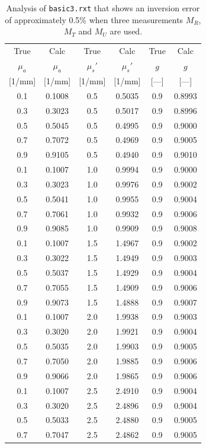 \documentclass{article}
\begin{document}
\begin{table}
\begin{center}
\begin{tabular}{cc|cc|cc}
True & Calc & True & Calc& True & Calc\\
$\mu_a$ & $\mu_a$ & $\mu_s'$ & $\mu_s'$ & $g$ &$g$\\
\hbox{}[1/mm] & [1/mm] & [1/mm] & [1/mm]& [---]& [---]  \\
\hline
0.1 & 0.1008 & 0.5 & 0.5035 & 0.9 & 0.8993\\
0.3 & 0.3023 & 0.5 & 0.5017 & 0.9 & 0.8996\\
0.5 & 0.5045 & 0.5 & 0.4995 & 0.9 & 0.9000\\
0.7 & 0.7072 & 0.5 & 0.4969 & 0.9 & 0.9005\\
0.9 & 0.9105 & 0.5 & 0.4940 & 0.9 & 0.9010\\[2mm]
0.1 & 0.1007 & 1.0 & 0.9994 & 0.9 & 0.9000\\
0.3 & 0.3023 & 1.0 & 0.9976 & 0.9 & 0.9002\\
0.5 & 0.5041 & 1.0 & 0.9955 & 0.9 & 0.9004\\
0.7 & 0.7061 & 1.0 & 0.9932 & 0.9 & 0.9006\\
0.9 & 0.9085 & 1.0 & 0.9909 & 0.9 & 0.9008\\[2mm]
0.1 & 0.1007 & 1.5 & 1.4967 & 0.9 & 0.9002\\
0.3 & 0.3022 & 1.5 & 1.4949 & 0.9 & 0.9003\\
0.5 & 0.5037 & 1.5 & 1.4929 & 0.9 & 0.9004\\
0.7 & 0.7055 & 1.5 & 1.4909 & 0.9 & 0.9006\\
0.9 & 0.9073 & 1.5 & 1.4888 & 0.9 & 0.9007\\[2mm]
0.1 & 0.1007 & 2.0 & 1.9938 & 0.9 & 0.9003\\
0.3 & 0.3020 & 2.0 & 1.9921 & 0.9 & 0.9004\\
0.5 & 0.5035 & 2.0 & 1.9903 & 0.9 & 0.9005\\
0.7 & 0.7050 & 2.0 & 1.9885 & 0.9 & 0.9006\\
0.9 & 0.9066 & 2.0 & 1.9865 & 0.9 & 0.9006\\[2mm]
0.1 & 0.1007 & 2.5 & 2.4910 & 0.9 & 0.9004\\
0.3 & 0.3020 & 2.5 & 2.4896 & 0.9 & 0.9004\\
0.5 & 0.5033 & 2.5 & 2.4880 & 0.9 & 0.9005\\
0.7 & 0.7047 & 2.5 & 2.4862 & 0.9 & 0.9005\\
\end{tabular}
\caption{Analysis of \texttt{basic3.rxt} that shows an inversion error
of approximately 0.5\% when three measurements $M_R$, $M_T$ and $M_U$ are
used.}
\end{center}
\end{table}
\end{document}
